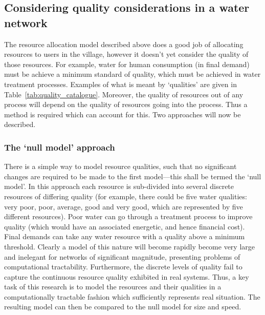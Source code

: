 \subsection{Considering quality considerations in a water network}
The resource allocation model described above does a good job of allocating resources to users in the village, however it doesn't yet consider the quality of those resources. For example, water for human consumption (in final demand) must be achieve a minimum standard of quality, which must be achieved in water treatment processes. Examples of what is meant by `qualities' are given in Table~\ref{tab:quality_catalogue}. Moreover, the quality of resources out of any process will depend on the quality of resources going into the process. Thus a method is required which can account for this. Two approaches will now be described.

 

\subsubsection*{The `null model' approach}
There is a simple way to model resource qualities, such that no significant changes are required to be made to the first model---this shall be termed the `null model'. In this approach each resource is sub-divided into several discrete resources of differing quality (for example, there could be five water qualities: very poor, poor, average, good and very good, which are represented by five different resources). Poor water can go through a treatment process to improve quality (which would have an associated energetic, and hence financial cost). Final demands can take any water resource with a quality above a minimum threshold. Clearly a model of this nature will become rapidly become very large and inelegant for networks of significant magnitude, presenting problems of computational tractability. Furthermore, the discrete levels of quality fail to capture the continuous resource quality exhibited in real systems.  Thus, a key task of this research is to model the resources and their qualities in a computationally tractable fashion which sufficiently represents real situation. The resulting model can then be compared to the null model for size and speed.

